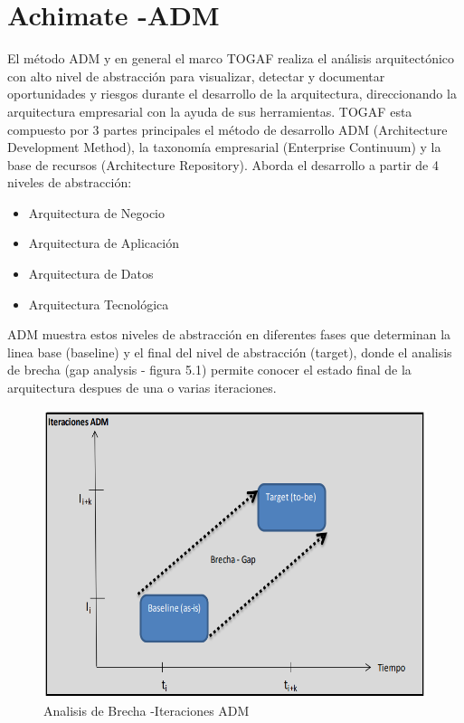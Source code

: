 \chapter{Achimate -ADM}

El método ADM y en general el marco TOGAF realiza el análisis arquitectónico con alto nivel de abstracción para visualizar, detectar y
	documentar oportunidades y riesgos durante el desarrollo de la arquitectura, direccionando la arquitectura empresarial con la ayuda de sus herramientas.
TOGAF esta compuesto por 3 partes principales el método de desarrollo ADM (Architecture Development Method), la taxonomía empresarial (Enterprise Continuum) y la base de recursos (Architecture Repository). Aborda el desarrollo a partir de 4 niveles de abstracción:
\begin{itemize}
	\item Arquitectura de Negocio
	\item Arquitectura de Aplicación
	\item Arquitectura de Datos
	\item Arquitectura Tecnológica
\end{itemize}
ADM muestra estos niveles de abstracción en diferentes fases que determinan la linea base (baseline) y el final del nivel de abstracción (target), donde el analisis de brecha (gap analysis - figura 5.1) permite conocer el estado final de la arquitectura despues de una o varias iteraciones.
\begin{figure}[H]
	\centering
	\includegraphics[width=1.0\textwidth]{imagenes/Captura.PNG}
	\caption{Analisis de Brecha -Iteraciones ADM}
	\label{fig:gap_analysis}
\end{figure}

